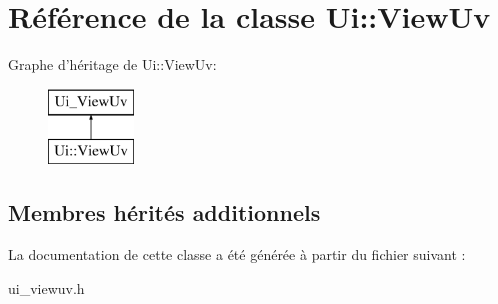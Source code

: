 \hypertarget{class_ui_1_1_view_uv}{\section{Référence de la classe Ui\+:\+:View\+Uv}
\label{class_ui_1_1_view_uv}
}
Graphe d'héritage de Ui\+:\+:View\+Uv\+:\begin{figure}[H]
\begin{center}
\leavevmode
\includegraphics[height=2.000000cm]{class_ui_1_1_view_uv}
\end{center}
\end{figure}
\subsection*{Membres hérités additionnels}


La documentation de cette classe a été générée à partir du fichier suivant \+:\begin{DoxyCompactItemize}
\item 
ui\+\_\+viewuv.\+h\end{DoxyCompactItemize}
